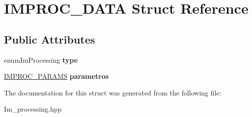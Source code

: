 \hypertarget{struct_i_m_p_r_o_c___d_a_t_a}{\section{I\+M\+P\+R\+O\+C\+\_\+\+D\+A\+T\+A Struct Reference}
\label{struct_i_m_p_r_o_c___d_a_t_a}
}
\subsection*{Public Attributes}
\begin{DoxyCompactItemize}
\item 
\hypertarget{struct_i_m_p_r_o_c___d_a_t_a_a6a0be95cf91d45344249b244a1f99a0a}{enum\+Im\+Processing {\bfseries type}}\label{struct_i_m_p_r_o_c___d_a_t_a_a6a0be95cf91d45344249b244a1f99a0a}

\item 
\hypertarget{struct_i_m_p_r_o_c___d_a_t_a_a46380fc6a06f8e95f6a19c2e541ef9c8}{\hyperlink{struct_i_m_p_r_o_c___p_a_r_a_m_s}{I\+M\+P\+R\+O\+C\+\_\+\+P\+A\+R\+A\+M\+S} {\bfseries parametros}}\label{struct_i_m_p_r_o_c___d_a_t_a_a46380fc6a06f8e95f6a19c2e541ef9c8}

\end{DoxyCompactItemize}


The documentation for this struct was generated from the following file\+:\begin{DoxyCompactItemize}
\item 
Im\+\_\+processing.\+hpp\end{DoxyCompactItemize}
